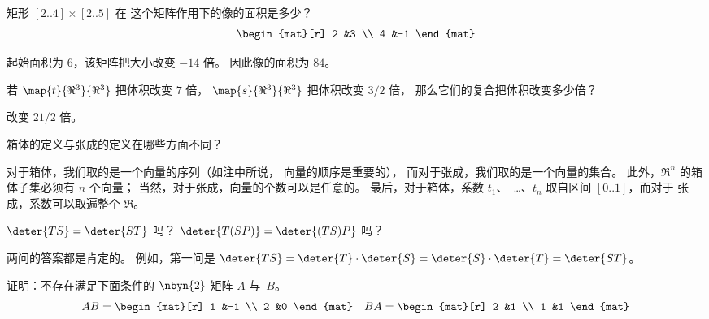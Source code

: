 \begin{exercises}
    矩形 \( [2..4]\times [2..5] \) 在
    这个矩阵作用下的像的面积是多少？
    \begin{equation*}
       \begin{mat}[r]
         2  &3  \\
         4  &-1
       \end{mat}
    \end{equation*}
    \begin{answer}
      起始面积为 \( 6 \)，该矩阵把大小改变
      \( -14 \) 倍。
      因此像的面积为 \( 84 \)。  
    \end{answer}
  \item
     若 \( \map{t}{\Re^3}{\Re^3} \) 把体积改变 \( 7 \) 倍，
     \( \map{s}{\Re^3}{\Re^3} \) 把体积改变 \( 3/2 \) 倍，
     那么它们的复合把体积改变多少倍？
     \begin{answer}
        改变 \( 21/2 \) 倍。
     \end{answer}
  \item 
    箱体的定义与张成的定义在哪些方面不同？
    \begin{answer}
      对于箱体，我们取的是一个向量的序列（如注中所说，
      向量的顺序是重要的），
      而对于张成，我们取的是一个向量的集合。
      此外，$\Re^n$ 的箱体子集必须有 $n$ 个向量； 
      当然，对于张成，向量的个数可以是任意的。
      最后，对于箱体，系数 $t_1$、~\ldots、$t_n$
      取自区间 $[0..1]$，而对于
      张成，系数可以取遍整个 $\Re$。 
    \end{answer}
  \item 
    \( \deter{TS}=\deter{ST} \) 吗？
    \( \deter{T(SP)}=\deter{(TS)P} \) 吗？
    \begin{answer}
      两问的答案都是肯定的。
      例如，第一问是 \( \deter{TS}=\deter{T}\cdot\deter{S}=
                     \deter{S}\cdot\deter{T}=\deter{ST} \)。  
    \end{answer}
  \item 证明：不存在满足下面条件的 $\nbyn{2}$ 矩阵 $A$ 与~$B$。 
   \begin{equation*}
     AB=\begin{mat}[r]
       1 &-1 \\
       2  &0
     \end{mat}
     \quad
     BA=\begin{mat}[r]
       2 &1 \\
       1  &1
     \end{mat}
   \end{equation*}

\end{exercises}

